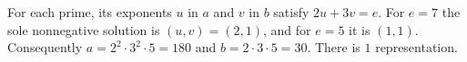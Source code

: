 For each prime, its exponents $u$ in $a$ and $v$ in $b$ satisfy $2u+3v=e$. For $e=7$ the sole nonnegative solution is $(u,v)=(2,1)$, and for $e=5$ it is $(1,1)$. Consequently $a=2^2\cdot3^2\cdot5=180$ and $b=2\cdot3\cdot5=30$. There is $\boxed1$ representation.

